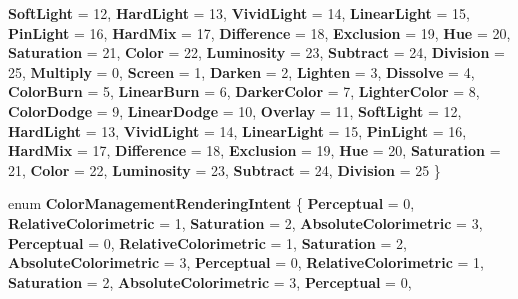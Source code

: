 \begin{DoxyCompactItemize}
{\bfseries Soft\+Light} = 12, 
{\bfseries Hard\+Light} = 13, 
\newline
{\bfseries Vivid\+Light} = 14, 
{\bfseries Linear\+Light} = 15, 
{\bfseries Pin\+Light} = 16, 
{\bfseries Hard\+Mix} = 17, 
\newline
{\bfseries Difference} = 18, 
{\bfseries Exclusion} = 19, 
{\bfseries Hue} = 20, 
{\bfseries Saturation} = 21, 
\newline
{\bfseries Color} = 22, 
{\bfseries Luminosity} = 23, 
{\bfseries Subtract} = 24, 
{\bfseries Division} = 25, 
\newline
{\bfseries Multiply} = 0, 
{\bfseries Screen} = 1, 
{\bfseries Darken} = 2, 
{\bfseries Lighten} = 3, 
\newline
{\bfseries Dissolve} = 4, 
{\bfseries Color\+Burn} = 5, 
{\bfseries Linear\+Burn} = 6, 
{\bfseries Darker\+Color} = 7, 
\newline
{\bfseries Lighter\+Color} = 8, 
{\bfseries Color\+Dodge} = 9, 
{\bfseries Linear\+Dodge} = 10, 
{\bfseries Overlay} = 11, 
\newline
{\bfseries Soft\+Light} = 12, 
{\bfseries Hard\+Light} = 13, 
{\bfseries Vivid\+Light} = 14, 
{\bfseries Linear\+Light} = 15, 
\newline
{\bfseries Pin\+Light} = 16, 
{\bfseries Hard\+Mix} = 17, 
{\bfseries Difference} = 18, 
{\bfseries Exclusion} = 19, 
\newline
{\bfseries Hue} = 20, 
{\bfseries Saturation} = 21, 
{\bfseries Color} = 22, 
{\bfseries Luminosity} = 23, 
\newline
{\bfseries Subtract} = 24, 
{\bfseries Division} = 25
 \}
\item 
\mbox{\label{namespace_microsoft_1_1_graphics_1_1_canvas_1_1_effects_a46519f571ff01b1f57ee3699fc97a7ce}} 
enum {\bfseries Color\+Management\+Rendering\+Intent} \{ \newline
{\bfseries Perceptual} = 0, 
{\bfseries Relative\+Colorimetric} = 1, 
{\bfseries Saturation} = 2, 
{\bfseries Absolute\+Colorimetric} = 3, 
\newline
{\bfseries Perceptual} = 0, 
{\bfseries Relative\+Colorimetric} = 1, 
{\bfseries Saturation} = 2, 
{\bfseries Absolute\+Colorimetric} = 3, 
\newline
{\bfseries Perceptual} = 0, 
{\bfseries Relative\+Colorimetric} = 1, 
{\bfseries Saturation} = 2, 
{\bfseries Absolute\+Colorimetric} = 3, 
\newline
{\bfseries Perceptual} = 0, 

\end{DoxyCompactItemize}
